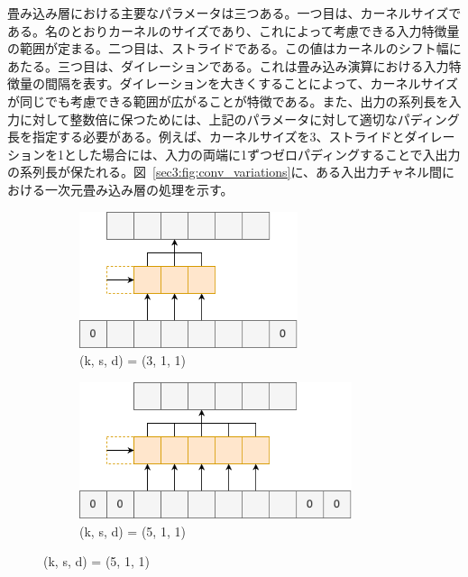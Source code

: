 \documentclass[12pt]{jarticle}
\numberwithin{equation}{section}    %
\numberwithin{figure}{section}      %
\numberwithin{table}{section}      %
\begin{document}
畳み込み層における主要なパラメータは三つある。一つ目は、カーネルサイズである。名のとおりカーネルのサイズであり、これによって考慮できる入力特徴量の範囲が定まる。二つ目は、ストライドである。この値はカーネルのシフト幅にあたる。三つ目は、ダイレーションである。これは畳み込み演算における入力特徴量の間隔を表す。ダイレーションを大きくすることによって、カーネルサイズが同じでも考慮できる範囲が広がることが特徴である。また、出力の系列長を入力に対して整数倍に保つためには、上記のパラメータに対して適切なパディング長を指定する必要がある。例えば、カーネルサイズを3、ストライドとダイレーションを1とした場合には、入力の両端に1ずつゼロパディングすることで入出力の系列長が保たれる。図~\ref{sec3:fig:conv_variations}に、ある入出力チャネル間における一次元畳み込み層の処理を示す。

\begin{figure}[tb]
    \centering
    \begin{subfigure}[b]{0.48\textwidth}
        \centering
        \includegraphics[height=4cm]{./figure/sec3/conv1.drawio.png}
        \caption{(k, s, d) = (3, 1, 1)}
        \label{sec3:fig:conv1}
    \end{subfigure}
    \begin{subfigure}[b]{0.48\textwidth}
        \centering
        \includegraphics[height=4cm]{./figure/sec3/conv2.drawio.png}
        \caption{(k, s, d) = (5, 1, 1)}
        \label{sec3:fig:conv2}
    \end{subfigure}

    \vspace{0.5cm}


\end{figure}
\end{document}
